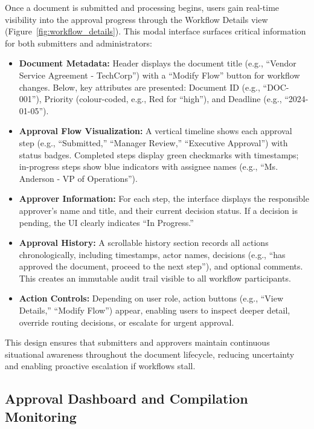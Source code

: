 \documentclass[12pt,oneside,openright,a4paper]{cpe-english-project}
\begin{document}
Once a document is submitted and processing begins, users gain real-time visibility into the approval progress through the Workflow Details view (Figure~\ref{fig:workflow_details}). This modal interface surfaces critical information for both submitters and administrators:

\begin{itemize}
\item \textbf{Document Metadata:} Header displays the document title (e.g., ``Vendor Service Agreement - TechCorp'') with a ``Modify Flow'' button for workflow changes. Below, key attributes are presented: Document ID (e.g., ``DOC-001''), Priority (colour-coded, e.g., Red for ``high''), and Deadline (e.g., ``2024-01-05'').
\item \textbf{Approval Flow Visualization:} A vertical timeline shows each approval step (e.g., ``Submitted,'' ``Manager Review,'' ``Executive Approval'') with status badges. Completed steps display green checkmarks with timestamps; in-progress steps show blue indicators with assignee names (e.g., ``Ms. Anderson - VP of Operations'').
\item \textbf{Approver Information:} For each step, the interface displays the responsible approver's name and title, and their current decision status. If a decision is pending, the UI clearly indicates ``In Progress.''
\item \textbf{Approval History:} A scrollable history section records all actions chronologically, including timestamps, actor names, decisions (e.g., ``has approved the document, proceed to the next step''), and optional comments. This creates an immutable audit trail visible to all workflow participants.
\item \textbf{Action Controls:} Depending on user role, action buttons (e.g., ``View Details,'' ``Modify Flow'') appear, enabling users to inspect deeper detail, override routing decisions, or escalate for urgent approval.
\end{itemize}

This design ensures that submitters and approvers maintain continuous situational awareness throughout the document lifecycle, reducing uncertainty and enabling proactive escalation if workflows stall.

\vspace{1em}

\subsection{Approval Dashboard and Compilation Monitoring}
\end{document}
